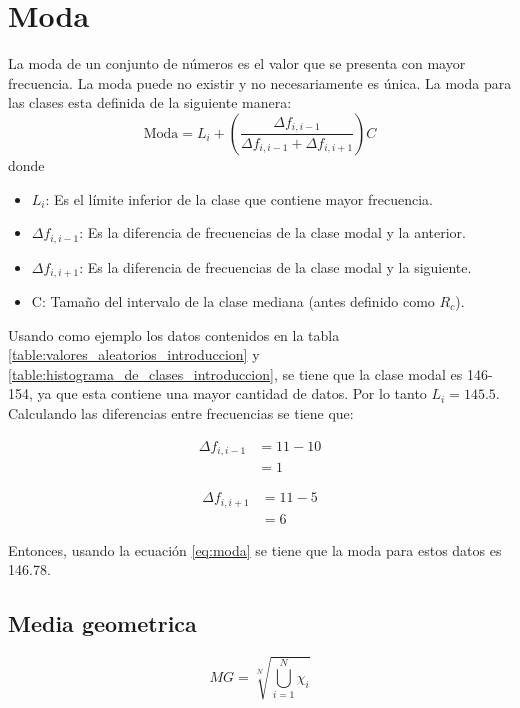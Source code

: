 \section{Moda}
La moda de un conjunto de números es el valor que se presenta con mayor frecuencia. La moda puede no existir y no necesariamente es única. La moda para las clases esta definida de la siguiente manera:
\begin{equation}
    \text{Moda}= L_i+ \left(\frac{\Delta f_{i,i-1}}{\Delta f_{i,i-1}+\Delta f_{i,i+1}}\right)C
    \label{eq:moda}
\end{equation}
donde\begin{itemize}
    \item $L_i$: Es el límite inferior de la clase que contiene mayor frecuencia.
    \item $\Delta f_{i,i-1}$: Es la diferencia de frecuencias de la clase modal y la anterior.
    \item $\Delta f_{i,i+1}$: Es la diferencia de frecuencias de la clase modal y la siguiente.
    \item C: Tamaño del intervalo de la clase mediana (antes definido como $R_c$).
\end{itemize}
Usando como ejemplo los datos contenidos en la tabla \ref{table:valores_aleatorios_introduccion} y \ref{table:histograma_de_clases_introduccion}, se tiene que la clase modal es 146-154, ya que esta contiene una mayor cantidad de datos. Por lo tanto $L_i=145.5$. Calculando las diferencias entre frecuencias se tiene que:\\
\begin{minipage}{0.5\linewidth}
    \begin{align*}
        \Delta f_{i,i-1} & = 11-10 \\
                         & =1
    \end{align*}
\end{minipage}
\begin{minipage}{0.5\linewidth}
    \begin{align*}
        \Delta f_{i,i+1} & =11-5 \\
                         & =6
    \end{align*}
\end{minipage}
Entonces, usando la ecuación \ref{eq:moda} se tiene que la moda para estos datos es 146.78.
\subsection{Media geometrica}
\begin{equation*}
    MG=\sqrt[N]{\bigcup_{i=1}^N \chi_i}
\end{equation*}
